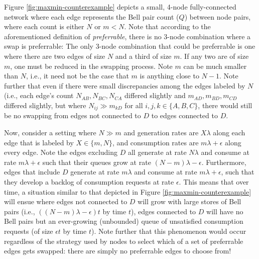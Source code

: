 Figure \ref{fig:maxmin-counterexample} depicts a small, 4-node fully-connected network where each edge represents the Bell pair count ($Q$) between node pairs, where each count is either $N$ or $m < N$.  Note that according to the aforementioned definition of {\em preferrable}, there is no 3-node combination where a swap is preferrable: The only 3-node combination that could be preferrable is one where there are two edges of size $N$ and a third of size $m$.  If any two are of size $m$, one must be reduced in the swapping process.  Note $m$ can be much smaller than $N$, i.e., it need not be the case that $m$ is anything close to $N-1$.  Note further that even if there were small discrepancies among the edges labeled by $N$ (i.e., each edge's count $N_{AB}, N_{BC}, N_{CA}$ differed slightly and $m_{AD}, m_{BD}, m_{CD}$ differed slightly, but where $N_{ij} \gg m_{kD}$ for all $i,j,k \in \{A,B,C\}$, there would still be no swapping from edges not connected to $D$ to edges connected to $D$.

Now, consider a setting where $N \gg m$ and generation rates are $X \lambda$ along each edge that is labeled by $X \in \{m,N\}$, and consumption rates are $m \lambda + \epsilon$ along every edge.  Note the edges excluding $D$ all generate at rate $N \lambda$ and consume at rate $m \lambda + \epsilon$ such that their queues grow at rate $(N-m) \lambda - \epsilon$.  Furthermore, edges that include $D$ generate at rate $m \lambda$ and consume at rate $m \lambda + \epsilon$, such that they develop a backlog of consumption requests at rate $\epsilon$.  This means that over time, a situation similar to that depicted in Figure \ref{fig:maxmin-counterexample} will ensue where edges not connected to $D$ will grow with large stores of Bell pairs (i.e., $((N-m) \lambda - \epsilon) t$ by time $t$), edges connected to $D$ will have no Bell pairs but an ever-growing (unbounded) queue of unsatisfied consumption requests (of size $\epsilon t$ by time $t$).  Note further that this phenomenon would occur regardless of the strategy used by nodes to select which of a set of preferrable edges gets swapped: there are simply no preferrable edges to choose from!
